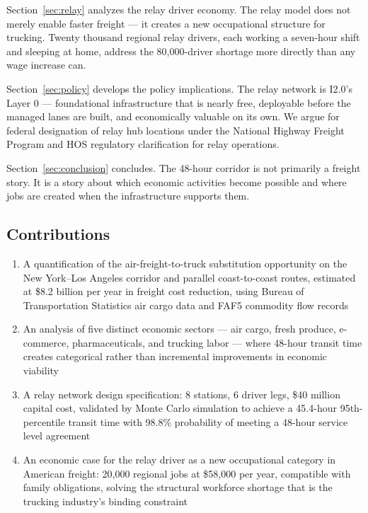 Section~\ref{sec:relay} analyzes the relay driver economy. The relay model does not merely
enable faster freight --- it creates a new occupational structure for trucking. Twenty thousand
regional relay drivers, each working a seven-hour shift and sleeping at home, address the
80,000-driver shortage more directly than any wage increase can.

Section~\ref{sec:policy} develops the policy implications. The relay network is I2.0's
Layer 0 --- foundational infrastructure that is nearly free, deployable before the managed
lanes are built, and economically valuable on its own. We argue for federal designation of
relay hub locations under the National Highway Freight Program and HOS regulatory clarification
for relay operations.

Section~\ref{sec:conclusion} concludes. The 48-hour corridor is not primarily a freight story.
It is a story about which economic activities become possible and where jobs are created when
the infrastructure supports them.

\subsection*{Contributions}

\begin{enumerate}
\item A quantification of the air-freight-to-truck substitution opportunity on the
      New York--Los Angeles corridor and parallel coast-to-coast routes, estimated at
      \$8.2 billion per year in freight cost reduction, using Bureau of Transportation
      Statistics air cargo data and FAF5 commodity flow records \citep{FAF5_2023,BTS_airfreight2023}
\item An analysis of five distinct economic sectors --- air cargo, fresh produce, e-commerce,
      pharmaceuticals, and trucking labor --- where 48-hour transit time creates categorical
      rather than incremental improvements in economic viability
\item A relay network design specification: 8 stations, 6 driver legs, \$40 million capital
      cost, validated by Monte Carlo simulation to achieve a 45.4-hour 95th-percentile
      transit time with 98.8\% probability of meeting a 48-hour service level agreement
\item An economic case for the relay driver as a new occupational category in American freight:
      20,000 regional jobs at \$58,000 per year, compatible with family obligations, solving
      the structural workforce shortage that is the trucking industry's binding constraint
\end{enumerate}
